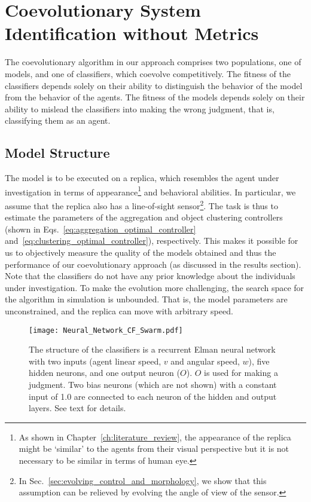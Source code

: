 
\section{Coevolutionary System Identification without Metrics}\label{sec:algorithm_implementation_swarm}

The coevolutionary algorithm in our approach comprises two populations, one of models, and one of classifiers, which coevolve competitively. The fitness of the classifiers depends solely on their ability to distinguish the behavior of the model from the behavior of the agents. The fitness of the models depends solely on their ability to mislead the classifiers into making the wrong judgment, that is, classifying them as an agent.

\subsection{Model Structure} 

The model is to be executed on a replica, which resembles the agent under investigation in terms of appearance\footnote{As shown in Chapter~\ref{ch:literature_review}, the appearance of the replica might be `similar'  to the agents from their visual perspective but it is not necessary to be similar in terms of human eye.} and behavioral abilities. In particular, we assume that the replica also has a line-of-sight sensor\footnote{In Sec.~\ref{sec:evolving_control_and_morphology}, we show that this assumption can be relieved by evolving the angle of view of the sensor.}. The task is thus to estimate the parameters of the aggregation and object clustering controllers (shown in Eqs.~\eqref{eq:aggregation_optimal_controller} and~\eqref{eq:clustering_optimal_controller}), respectively. This makes it possible for us to objectively measure the quality of the models obtained and thus the performance of our coevolutionary approach (as discussed in the results section). Note that the classifiers do not have any prior knowledge about the individuals under investigation. To make the evolution more challenging, the search space for the algorithm in simulation is unbounded. That is, the model parameters are unconstrained, and the replica can move with arbitrary speed. 

\begin{figure}[!t]
	\centering
	\texttt{[image: Neural\_Network\_CF\_Swarm.pdf]}
	\caption{The structure of the classifiers is a recurrent Elman neural 
    network with two inputs (agent linear speed, $v$ and angular speed, $w$), five hidden neurons, and one output neuron ($O$). $O$ is used for making a judgment. Two bias neurons (which are not shown) with a constant input of 1.0 are connected to each neuron of the hidden and output layers. See text for details.}
	\label{fig:neural_network_cf_swarm}
\end{figure}

